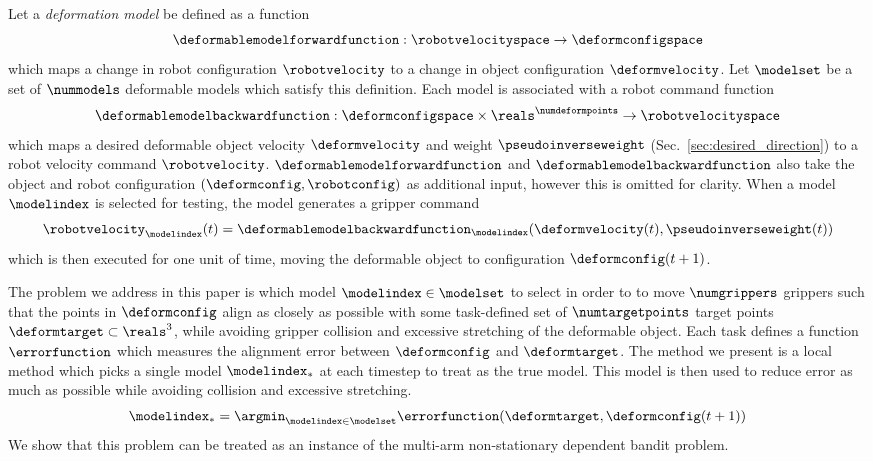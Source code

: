 Let a \textit{deformation model} be defined as a function 
\begin{equation}
    \deformablemodelforwardfunction : \robotvelocityspace \rightarrow \deformconfigspace
\end{equation}
which maps a change in robot configuration $\robotvelocity$ to a change in object configuration $\deformvelocity$. Let $\modelset$ be a set of $\nummodels$ deformable models which satisfy this definition. Each model is associated with a robot command function
\begin{equation}
    \deformablemodelbackwardfunction : \deformconfigspace \times \reals^\numdeformpoints \rightarrow \robotvelocityspace
\end{equation}
which maps a desired deformable object velocity $\deformvelocity$ and weight $\pseudoinverseweight$ (Sec.~\ref{sec:desired_direction}) to a robot velocity command $\robotvelocity$. $\deformablemodelforwardfunction$ and $\deformablemodelbackwardfunction$ also take the object and robot configuration $(\deformconfig,\robotconfig)$ as additional input, however this is omitted for clarity. When a model $\modelindex$ is selected for testing, the model generates a gripper command
\begin{equation}
    \robotvelocity_{\modelindex}(t) = \deformablemodelbackwardfunction_\modelindex(\deformvelocity(t), \pseudoinverseweight(t))
    \label{eqn:robotvelocity}
\end{equation}
which is then executed for one unit of time, moving the deformable object to configuration $\deformconfig(t+1)$.


The problem we address in this paper is which model $\modelindex \in \modelset$ to select in order to to move $\numgrippers$ grippers such that the points in $\deformconfig$ align as closely as possible with some task-defined set of $\numtargetpoints$ target points $\deformtarget \subset \reals^3$, while avoiding gripper collision and excessive stretching of the deformable object. Each task defines a function $\errorfunction$ which measures the alignment error between $\deformconfig$ and $\deformtarget$. The method we present is a local method which picks a single model $\modelindex_{*}$ at each timestep to treat as the true model. This model is then used to reduce error as much as possible while avoiding collision and excessive stretching. 
\begin{equation}
    \modelindex_* = \argmin_{\modelindex \in \modelset} \errorfunction(\deformtarget, \deformconfig(t+1))
    \label{eqn:modelselection}
\end{equation}
We show that this problem can be treated as an instance of the multi-arm non-stationary dependent bandit problem.


